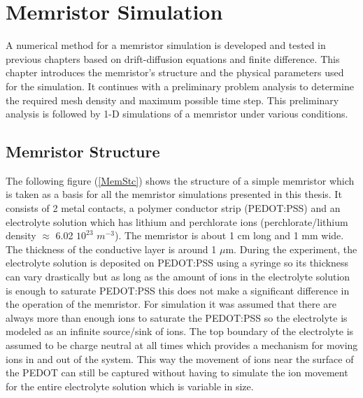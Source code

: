 
\chapter{Memristor Simulation} %

\label{Chapter5} %


\begin{doublespace}

A numerical method for a memristor simulation is developed and tested in previous chapters based on drift-diffusion equations and finite difference. This chapter introduces the memristor's structure and the physical parameters used for the simulation. It continues with a preliminary problem analysis to determine the required mesh density and maximum possible time step. This preliminary analysis is followed by 1-D simulations of a memristor under various conditions.


\section{Memristor Structure}

The following figure (\ref{MemStc}) shows the structure of a simple memristor which is taken as a basis for all the memristor simulations presented in this thesis. It consists of 2 metal contacts, a polymer conductor strip (PEDOT:PSS) and an electrolyte solution which has lithium and perchlorate ions (perchlorate/lithium density $\approx$ 6.02 $10^{23}$ $m^{-3}$). The memristor is about 1 cm long and 1 mm wide. The thickness of the conductive layer is around 1 $\mu$m. During the experiment, the electrolyte solution is deposited on PEDOT:PSS using a syringe so its thickness can vary drastically but as long as the amount of ions in the electrolyte solution is enough to saturate PEDOT:PSS this does not make a significant difference in the operation of the memristor. For simulation it was assumed that there are always more than enough ions to saturate the PEDOT:PSS so the electrolyte is modeled as an infinite source/sink of ions. The top boundary of the electrolyte is assumed to be charge neutral at all times which provides a mechanism for moving ions in and out of the system. This way the movement of ions near the surface of the PEDOT can still be captured without having to simulate the ion movement for the entire electrolyte solution which is variable in size. 


\end{doublespace}
